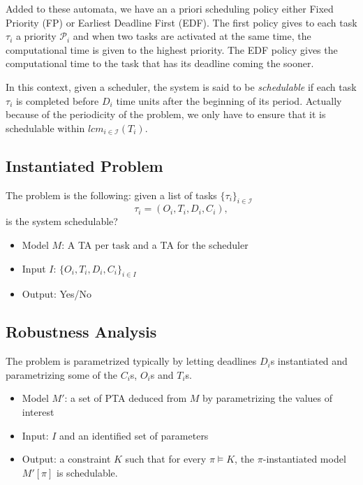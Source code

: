 \documentclass{article}
\begin{document}
Added to these automata, we have an a priori scheduling policy either Fixed Priority (FP) or Earliest Deadline First (EDF). The first policy gives to each task $\tau_i$ 
a priority $\mathcal{P}_i$ and when
two tasks are activated at the same time, the computational time is given to the highest priority. The EDF policy gives the computational time to the task that has its deadline coming
the sooner.

In this context, given a scheduler, the system is said to be \emph{schedulable} if each task $\tau_i$ is completed before $D_i$ time units after the beginning of its period. 
Actually because of the periodicity of the problem, we only have to ensure that it is schedulable within $lcm_{i\in \mathcal{I}}(T_i)$.

\subsection{Instantiated Problem}
The problem is the following: given a list of tasks $\{\tau_i\}_{i \in \mathcal{I}}$ $$\tau_i = (O_i,T_i,D_i,C_i),$$ is the system schedulable?\\
\begin{itemize}
 \item Model $M$: A TA per task and a TA for the scheduler
 \item Input $I$: $\{O_i,T_i,D_i,C_i\}_{i \in I}$
 \item Output: Yes/No
\end{itemize}


\subsection{Robustness Analysis}
The problem is parametrized typically by letting deadlines $D_i$s instantiated and parametrizing some of the $C_i$s, $O_i$s and $T_i$s.
\begin{itemize}
 \item Model $M'$: a set of PTA deduced from $M$ by parametrizing the values of interest
 \item Input: $I$ and an identified set of parameters
 \item Output: a constraint $K$ such that for every $\pi \models K$, the $\pi$-instantiated model $M'[\pi]$ is schedulable.
\end{itemize}


% 
% 
% 
\end{document}
